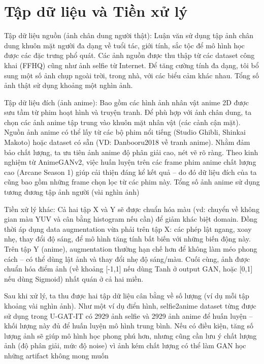 \section{Tập dữ liệu và Tiền xử lý}

Tập dữ liệu nguồn (ảnh chân dung người thật): Luận văn sử dụng tập ảnh chân dung khuôn mặt người
đa dạng về tuổi tác, giới tính, sắc tộc để mô hình học được các đặc trưng phổ quát. Các ảnh nguồn được thu
thập từ các dataset công khai (FFHQ) cũng như ảnh selfie từ Internet. Để tăng cường tính đa dạng, tôi bổ sung
một số ảnh chụp ngoài trời, trong nhà, với các biểu cảm khác nhau. Tổng số ảnh thật sử dụng khoảng một nghìn ảnh.

Tập dữ liệu đích (ảnh anime): Bao gồm các hình ảnh nhân vật anime 2D được sưu tầm từ phim hoạt hình
và truyện tranh. Để phù hợp với ảnh chân dung, ta chọn các ảnh anime tập trung vào khuôn mặt nhân vật
(các cảnh cận mặt). Nguồn ảnh anime có thể lấy từ các bộ phim nổi tiếng (Studio Ghibli, Shinkai Makoto)
hoặc dataset có sẵn (VD: Danbooru2018 về tranh anime). Nhằm đảm bảo chất lượng, ta ưu tiên ảnh anime
độ phân giải cao, nét vẽ rõ ràng. Theo kinh nghiệm từ AnimeGANv2, việc huấn luyện trên các frame phim
anime chất lượng cao (Arcane Season 1) giúp cải thiện đáng kể kết quả – do đó dữ liệu đích của
ta cũng bao gồm những frame chọn lọc từ các phim này. Tổng số ảnh anime sử dụng tương đương tập ảnh
người (vài nghìn ảnh)

Tiền xử lý khác: Cả hai tập X và Y sẽ được chuẩn hóa màu (vd: chuyển về không gian màu YUV và cân bằng
histogram nếu cần) để giảm khác biệt domain. Đồng thời áp dụng data augmentation vừa phải trên tập X:
các phép lật ngang, xoay nhẹ, thay đổi độ sáng, để mô hình tăng tính bất biến với những biến động này.
Trên tập Y (anime), augmentation thường hạn chế hơn để không làm méo phong cách – có thể dùng lật ảnh
và thay đổi nhẹ độ sáng/màu. Cuối cùng, ảnh được chuẩn hóa điểm ảnh (về khoảng [-1,1] nếu dùng Tanh ở
output GAN, hoặc [0,1] nếu dùng Sigmoid) nhất quán ở cả hai miền.

Sau khi xử lý, ta thu được hai tập dữ liệu cân bằng về số lượng (ví dụ mỗi tập khoảng vài nghìn ảnh). Như
một ví dụ điển hình, selfie2anime dataset từng được sử dụng trong U-GAT-IT có  2929 ảnh selfie và 
2929 ảnh anime để huấn luyện – khối lượng này đủ để huấn luyện mô hình trung bình. Nếu có điều kiện,
tăng số lượng ảnh sẽ giúp mô hình học phong phú hơn, nhưng cũng cần lưu ý chất lượng ảnh (độ phân
giải, mức độ noise) vì ảnh kém chất lượng có thể làm GAN học những artifact không mong muốn











